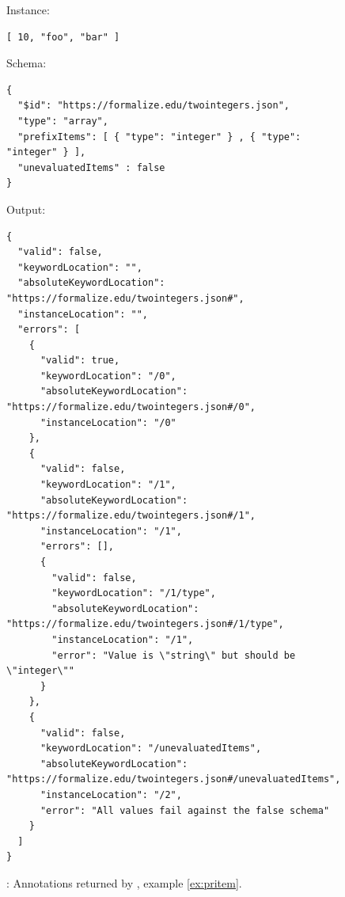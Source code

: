\begin{figure}
\small

Instance:
\begin{querybox}{}
\begin{lstlisting}[style=querynonumbers]
[ 10, "foo", "bar" ]
\end{lstlisting}
\end{querybox}

Schema:
\begin{querybox}{}
\begin{lstlisting}[style=query]
{
  "$id": "https://formalize.edu/twointegers.json",
  "type": "array",
  "prefixItems": [ { "type": "integer" } , { "type": "integer" } ],
  "unevaluatedItems" : false
}
\end{lstlisting}
\end{querybox}


Output:
\begin{querybox}{}
\begin{lstlisting}[style=query]
{
  "valid": false,
  "keywordLocation": "",
  "absoluteKeywordLocation": "https://formalize.edu/twointegers.json#",
  "instanceLocation": "",
  "errors": [
    {
      "valid": true,
      "keywordLocation": "/0",
      "absoluteKeywordLocation": "https://formalize.edu/twointegers.json#/0",
      "instanceLocation": "/0"
    },
    {
      "valid": false,
      "keywordLocation": "/1",
      "absoluteKeywordLocation": "https://formalize.edu/twointegers.json#/1",
      "instanceLocation": "/1",
      "errors": [],
      {
        "valid": false,
        "keywordLocation": "/1/type",
        "absoluteKeywordLocation": "https://formalize.edu/twointegers.json#/1/type",
        "instanceLocation": "/1",
        "error": "Value is \"string\" but should be \"integer\""
      }
    },
    {
      "valid": false,
      "keywordLocation": "/unevaluatedItems",
      "absoluteKeywordLocation": "https://formalize.edu/twointegers.json#/unevaluatedItems",
      "instanceLocation": "/2",
      "error": "All values fail against the false schema"
    }
  ]
}
\end{lstlisting}
\end{querybox}

\caption{{\qprefIts}: Annotations returned by {\JE}, example \ref{ex:pritem}.}
\label{fig:pritemje}
\end{figure}


